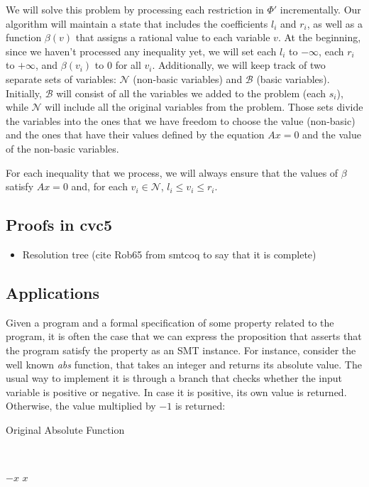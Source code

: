 We will solve this problem by processing each restriction in $\Phi'$ incrementally. Our algorithm will maintain a state that includes the coefficients $l_{i}$ and $r_{i}$, as well as a function $\beta(v)$ that assigns a rational value to each variable $v$. At the beginning, since we haven't processed any inequality yet, we will set each $l_{i}$ to $-\infty$, each $r_{i}$ to $+\infty$, and $\beta(v_{i})$ to $0$ for all $v_{i}$. Additionally, we will keep track of two separate sets of variables: $\mathcal{N}$ (non-basic variables) and $\mathcal{B}$ (basic variables). Initially, $\mathcal{B}$ will consist of all the variables we added to the problem (each $s_{i}$), while $\mathcal{N}$ will include all the original variables from the problem. Those sets divide the variables into the ones that we have freedom to choose the value (non-basic) and the ones that have their values defined by the equation $Ax = 0$ and the value of the non-basic variables.

For each inequality that we process, we will always ensure that the values of $\beta$ satisfy $Ax = 0$ and, for each $v_{i} \in \mathcal{N}$, $l_{i} \le v_{i} \le r_{i}$.


\subsection{Proofs in cvc5}

\begin{itemize}
  \item Resolution tree (cite Rob65 from smtcoq to say that it is complete)
\end{itemize}

\subsection{Applications}

Given a program and a formal specification of some property related to the program, it is often  the case that we can express the proposition that asserts that the program satisfy the property as an SMT instance. For instance, consider the well known \textit{abs} function, that takes an integer and returns its absolute value. The usual way to implement it is through a branch that checks whether the input variable is positive or negative. In case it is positive, its own value is returned. Otherwise, the value multiplied by $-1$ is returned:

\begin{algorithm}[H]
\caption{Original Absolute Function}~\label{originalAbs}
\begin{algorithmic}[1]
  \State\Return$-x$
\Else
  \State\Return$x$
\EndIf
\EndFunction
\end{algorithmic}
\end{algorithm}

